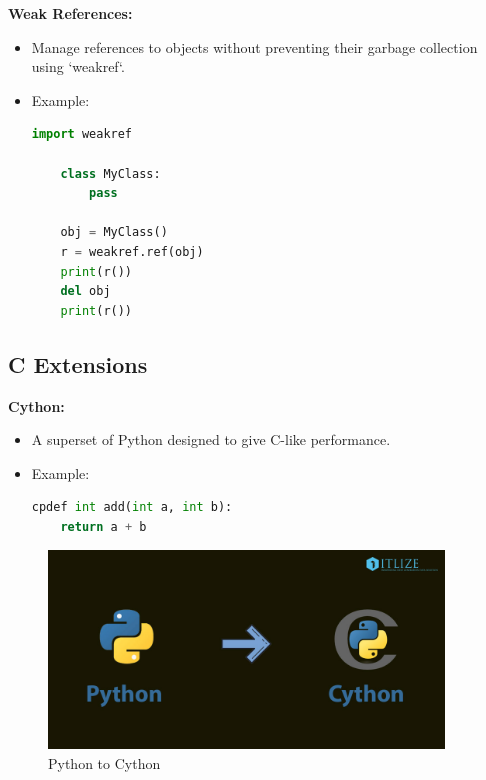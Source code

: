 \documentclass[12pt]{article}
\begin{document}
\textbf{Weak References:}
\begin{itemize}
    \item Manage references to objects without preventing their garbage collection using `weakref`.

    \item Example:\\
    \begin{lstlisting}[language = Python]
    import weakref

    class MyClass:
        pass
    
    obj = MyClass()
    r = weakref.ref(obj)
    print(r())
    del obj
    print(r())
    \end{lstlisting}
    
\end{itemize}

\subsection{C Extensions}

\textbf{Cython:}
\begin{itemize}
    \item A superset of Python designed to give C-like performance.

    \item Example:\\
    \begin{lstlisting}[language = Python]
    cpdef int add(int a, int b):
    return a + b
    \end{lstlisting}
    
\end{itemize}

\begin{figure}[h!]
\begin{center}
\includegraphics[width=10.5cm]{advanced7.jpg}\\
Python to Cython
\end{center}
\end{figure}
\end{document}
